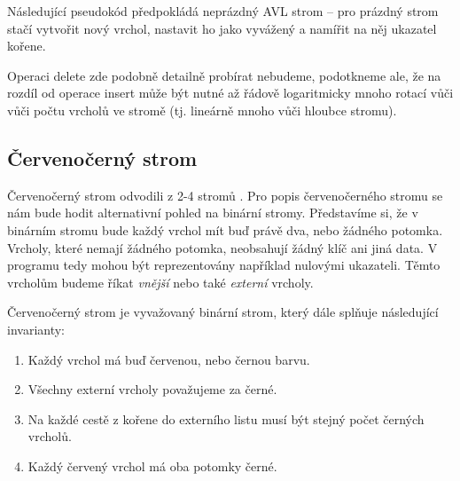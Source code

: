 Následující pseudokód předpokládá neprázdný
AVL strom -- pro prázdný strom stačí vytvořit nový vrchol, nastavit ho jako vyvážený a namířit na něj ukazatel kořene.



Operaci delete zde podobně detailně probírat nebudeme, podotkneme ale, že na rozdíl od operace insert může být nutné až řádově logaritmicky mnoho rotací vůči vůči počtu vrcholů ve stromě (tj. lineárně mnoho vůči hloubce stromu).



\subsection{Červenočerný strom}

Červenočerný strom odvodili z 2-4 stromů \citet{redblack}. Pro popis
červenočerného stromu se nám bude hodit alternativní pohled na binární stromy.
Představíme si, že v binárním stromu bude každý vrchol mít buď právě dva, nebo
žádného potomka. Vrcholy, které nemají žádného potomka, neobsahují žádný klíč
ani jiná data. V programu tedy mohou být reprezentovány například nulovými
ukazateli. Těmto vrcholům budeme říkat \emph{vnější} nebo také \emph{externí}
vrcholy.

Červenočerný strom je vyvažovaný binární strom, který dále splňuje následující invarianty:

\begin{enumerate}
\item Každý vrchol má buď červenou, nebo černou barvu.
\item Všechny externí vrcholy považujeme za černé.
\item Na každé cestě z kořene do externího listu musí být stejný počet černých vrcholů.
\item Každý červený vrchol má oba potomky černé.
\end{enumerate}

